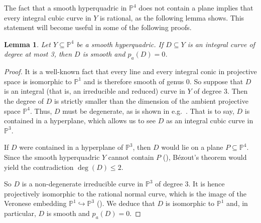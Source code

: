 \documentclass[english,11pt,reqno]{amsart}
\newcommand{\sub}{\subseteq}
\newcommand{\Pone}{\mathbb{P}^1}
\newcommand{\Pthree}{\mathbb{P}^3}
\newcommand{\Pfour}{\mathbb{P}^4}
\newtheorem{lem}[thm]{Lemma}
\begin{document}
%
The fact that a smooth hyperquadric in $\Pfour$ does not contain a plane implies that every integral cubic curve in $Y$ is rational, as the following lemma shows. This statement will become useful in some of the following proofs. 
%
%
\begin{lem} \label{lem:curve_degree3_genus1}
Let $Y\sub \Pfour $ be a smooth hyperquadric. If $D\sub Y$ is an integral curve of degree at most 3, then $D$ is smooth and $p_a(D) = 0$.
\end{lem}
%
\begin{proof}
It is a well-known fact that every line and every integral conic in projective space is isomorphic to $\Pone$ and is therefore smooth of genus 0. So suppose that $D$ is an integral (that is, an irreducible and reduced) curve in $Y$ of degree 3. Then the degree of $D$ is strictly smaller than the dimension of the ambient projective space $\Pfour$. Thus, $D$ must be degenerate, as is shown in e.g.\ \cite[p.\ 173]{Griffiths_Harris_Principles_of_Alg_Geom}. That is to say, $D$ is contained in a hyperplane, which allows us to see $D$ as an integral cubic curve in $\Pthree$. \par 
If $D$ were contained in a hyperplane of $\Pthree$, then $D$ would lie on a plane $P\sub \Pfour$. Since the smooth hyperquadric $Y$ cannot contain $P$ (), Bézout's theorem would yield the contradiction $\deg(D)\leq 2$. \par 
So $D$ is a non-degenerate irreducible curve in $\Pthree$ of degree 3. It is hence projectively isomorphic to the rational normal curve, which is the image of the Veronese embedding $\Pone \hookrightarrow \Pthree$ (\cite[p.\ 179]{Griffiths_Harris_Principles_of_Alg_Geom}). We deduce that $D$ is isomorphic to $\Pone$ and, in particular, $D$ is smooth and $p_a(D)=0$.
\end{proof}
%
%
%

%
\end{document}
